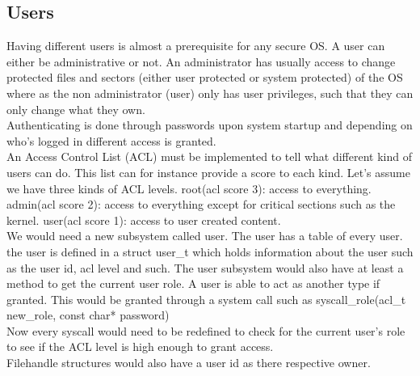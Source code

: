 \documentclass[]{article}
\begin{document}
\subsection*{Users}

Having different users is almost a prerequisite for any secure OS. A user can either be administrative or not. An administrator has usually access to change protected files and sectors (either user protected or system protected) of the OS where as the non administrator (user) only has user privileges, such that they can only change what they own. \\

Authenticating is done through passwords upon system startup and depending on who's logged in different access is granted. \\

An Access Control List (ACL) must be implemented to tell what different kind of users can do. This list can for instance provide a score to each kind.  Let's assume we have three kinds of ACL levels. root(acl score 3): access to everything. admin(acl score 2): access to everything except for critical sections such as the kernel. user(acl score 1): access to user created content. \\

We would need a new subsystem called user. The user has a table of every user. the user is defined in a struct user\_t which holds information about the user such as the user id, acl level and such. The user subsystem would also have at least a method to get the current user role. A user is able to act as another type if granted. This would be granted through a system call such as syscall\_role(acl\_t new\_role, const char* password)\\

Now every syscall would need to be redefined to check for the current user's role to see if the ACL level is high enough to grant access. \\

Filehandle structures would also have a user id as there respective owner.
\end{document}

